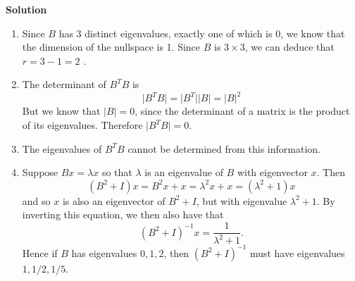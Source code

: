 \documentclass[11pt]{article}
\begin{document}
\noindent \textbf{Solution} \\
\begin{enumerate}
\item Since $B$ has 3 distinct eigenvalues, exactly one of which is 0, we know that the dimension of the nullspace is 1. Since $B$ is $3\times 3$, we can deduce that $r = 3-1 = 2$ .
\item The determinant of $B^TB$ is 
$$\vert B^TB \vert = \vert B^T \vert \vert B\vert = \vert B \vert^2$$
But we know that $\vert B \vert = 0$, since the determinant of a matrix is the product of its eigenvalues. Therefore $\vert B^TB \vert = 0$.
\item The eigenvalues of $B^TB$ cannot be determined from this information.
\item Suppose $Bx = \lambda x$ so that $\lambda$ is an eigenvalue of $B$ with eigenvector $x$. Then
$$(B^2 + I)x = B^2x + x = \lambda^2 x + x = (\lambda^2 +1)x$$
and so $x$ is also an eigenvector of $B^2+I$, but with eigenvalue $\lambda^2 + 1$. By inverting this equation, we then also have that
$$(B^2+I)^{-1} x = \frac{1}{\lambda^2 +1}.$$
Hence if $B$ has eigenvalues $0,1,2$, then $(B^2+I)^{-1}$ must have eigenvalues $1,1/2, 1/5$.
\end{enumerate}
\end{document}
